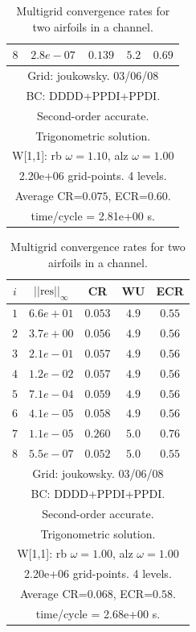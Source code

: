 \begin{table}[hbt]
\begin{center}
{\begin{tabular}{|c|c|c|c|c|}
 $ 8$  & $ 2.8e-07$ & $0.139$ & $ 5.2$ & $0.69$ \\ 
\hline 
\multicolumn{5}{|c|}{Grid: joukowsky. 03/06/08}  \\
\multicolumn{5}{|c|}{BC: DDDD+PPDI+PPDI.}  \\
\multicolumn{5}{|c|}{Second-order accurate.}  \\
\multicolumn{5}{|c|}{Trigonometric solution.}  \\
\multicolumn{5}{|c|}{W[1,1]: rb $\omega=1.10$, alz $\omega=1.00$}  \\
\multicolumn{5}{|c|}{2.20e+06 grid-points. 4 levels.}  \\
\multicolumn{5}{|c|}{Average CR=$0.075$, ECR=$0.60$.}  \\
\multicolumn{5}{|c|}{time/cycle = 2.81e+00 s.}  \\
\hline 
\end{tabular}
\begin{tabular}{|c|c|c|c|c|} \hline 
 $i$   & $\vert\vert\mbox{res}\vert\vert_\infty$  &  CR     &  WU    & ECR  \\   \hline 
 $ 1$  & $ 6.6e+01$ & $0.053$ & $ 4.9$ & $0.55$ \\ 
 $ 2$  & $ 3.7e+00$ & $0.056$ & $ 4.9$ & $0.56$ \\ 
 $ 3$  & $ 2.1e-01$ & $0.057$ & $ 4.9$ & $0.56$ \\ 
 $ 4$  & $ 1.2e-02$ & $0.057$ & $ 4.9$ & $0.56$ \\ 
 $ 5$  & $ 7.1e-04$ & $0.059$ & $ 4.9$ & $0.56$ \\ 
 $ 6$  & $ 4.1e-05$ & $0.058$ & $ 4.9$ & $0.56$ \\ 
 $ 7$  & $ 1.1e-05$ & $0.260$ & $ 5.0$ & $0.76$ \\ 
 $ 8$  & $ 5.5e-07$ & $0.052$ & $ 5.0$ & $0.55$ \\ 
\hline 
\multicolumn{5}{|c|}{Grid: joukowsky. 03/06/08}  \\
\multicolumn{5}{|c|}{BC: DDDD+PPDI+PPDI.}  \\
\multicolumn{5}{|c|}{Second-order accurate.}  \\
\multicolumn{5}{|c|}{Trigonometric solution.}  \\
\multicolumn{5}{|c|}{W[1,1]: rb $\omega=1.00$, alz $\omega=1.00$}  \\
\multicolumn{5}{|c|}{2.20e+06 grid-points. 4 levels.}  \\
\multicolumn{5}{|c|}{Average CR=$0.068$, ECR=$0.58$.}  \\
\multicolumn{5}{|c|}{time/cycle = 2.68e+00 s.}  \\
\hline 
\end{tabular}
} %
\end{center}
\caption{Multigrid convergence rates for two airfoils in a channel.}
\label{fig:airfoils2}
\end{table}











